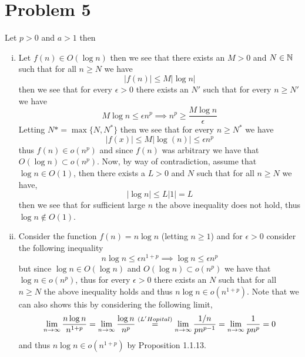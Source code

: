 \documentclass[12pt]{report}
\begin{document}
\section*{Problem 5}
Let $p > 0$ and $a > 1$ then
\begin{enumerate}[(i)]
    \item Let $f(n) \in O(\log n)$ then we see that there exists an $M > 0$ and $N \in \mathbb{N}$ such that for all $n \geq N$ we have
    \begin{equation*}
        |f(n)| \leq M |\log n|
    \end{equation*}
    then we see that for every $\epsilon > 0$ there exists an $N'$ such that for every $n \geq N'$ we have
    \begin{equation*}
        M\log n \leq \epsilon n^p \implies n^p \geq \frac{M\log n}{\epsilon}
    \end{equation*}
    Letting $N* = \max\{N, N^*\}$ then we see that for every $n \geq N^*$ we have
    \begin{equation*}
        |f(x)| \leq M|\log(n)| \leq \epsilon n^p
    \end{equation*}
    thus $f(n) \in o(n^p)$ and since $f(n)$ was arbitrary we have that $O(\log n) \subset o(n^p)$. Now, by way of contradiction, assume that $\log n \in O(1)$, then there exists a $L >0$ and $N$ such that for all $n \geq N$ we have,
    \begin{equation*}
        |\log n| \leq L |1| = L
    \end{equation*}
    then we see that for sufficient large $n$ the above inequality does not hold, thus $\log n \not \in O(1)$.
    \item Consider the function $f(n) = n\log n$ (letting $n \geq 1$) and for $\epsilon > 0$ consider the following inequality
    \begin{equation*}
        n\log n \leq \epsilon n^{1+p} \implies \log n \leq \epsilon n^p
    \end{equation*}
    but since $\log n \in O(\log n)$ and $O(\log n) \subset o(n^p)$ we have that $\log n \in o(n^p)$, thus for every $\epsilon > 0$ there exists an $N$ such that for all $n \geq N$ the above inequality holds and thus $n\log n \in o(n^{1+p})$. Note that we can also shows this by considering the following limit,
    \begin{equation*}
        \lim_{n \to \infty} \frac{n\log n}{n^{1+p}} = \lim_{n \to \infty}\frac{\log n}{n^p} \stackrel{\tiny{(L'Hopital)}}{=} \lim_{n \to \infty} \frac{1/n}{pn^{p-1}} = \lim_{n\to \infty} \frac{1}{pn^p} = 0
    \end{equation*}
    and thus $n\log n \in o(n^{1+p})$ by Proposition 1.1.13.
    

\end{enumerate}
\end{document}
